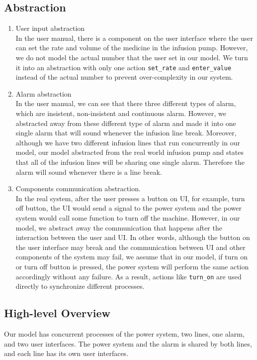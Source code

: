 \documentclass[titlepage]{article}
\begin{document}
    \subsection{Abstraction}
    \begin{enumerate}
        \item User input abstraction\\
        In the user manual, there is a component on the user interface where the user can set the rate and volume of the medicine in the infusion pump. However, we do not model the actual number that the user set in our model. We turn it into an abstraction with only one action \texttt{set\_rate} and \texttt{enter\_value} instead of the actual number to prevent over-complexity in our system.
        \item Alarm abstraction\\
        In the user manual, we can see that there three different types of alarm, which are insistent, non-insistent and continuous alarm. However, we abstracted away from these different type of alarm and made it into one single alarm that will sound whenever the infusion line break. Moreover, although we have two different infusion lines that run concurrently in our model, our model abstracted from the real world infusion pump and states that all of the infusion lines will be sharing one single alarm. Therefore the alarm will sound whenever there is a line break.
        \item Components communication abstraction.\\
        In the real system, after the user presses a button on UI, for example, turn off button, the UI would send a signal to the power system and the power system would call some function to turn off the machine. However, in our model, we abstract away the communication that happens after the interaction between the user and UI. In other words, although the button on the user interface may break and the communication between UI and other components of the system may fail, we assume that in our model, if turn on or turn off button is pressed, the power system will perform the same action accordingly without any failure. As a result, actions like \texttt{turn\_on} are used directly to synchronize different processes.
    \end{enumerate}
    
    \subsection{High-level Overview}
        Our model has concurrent processes of the power system, two lines, one alarm, and two user interfaces. The power system and the alarm is shared by both lines, and each line has its own user interfaces.  
   
\end{document}

